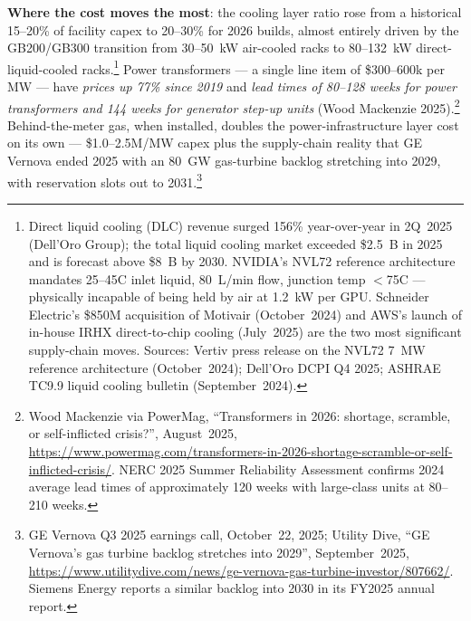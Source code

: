 \textbf{Where the cost moves the most}: the cooling layer ratio rose from a historical 15--20\% of facility capex to 20--30\% for 2026 builds, almost entirely driven by the GB200/GB300 transition from 30--50~kW air-cooled racks to 80--132~kW direct-liquid-cooled racks.\footnote{Direct liquid cooling (DLC) revenue surged 156\% year-over-year in 2Q~2025 (Dell'Oro Group); the total liquid cooling market exceeded \$2.5~B in 2025 and is forecast above \$8~B by 2030. NVIDIA's NVL72 reference architecture mandates 25--45\textdegree C inlet liquid, 80~L/min flow, junction temp $<$75\textdegree C --- physically incapable of being held by air at 1.2~kW per GPU. Schneider Electric's \$850M acquisition of Motivair (October~2024) and AWS's launch of in-house IRHX direct-to-chip cooling (July~2025) are the two most significant supply-chain moves. Sources: Vertiv press release on the NVL72 7~MW reference architecture (October~2024); Dell'Oro DCPI Q4 2025; ASHRAE TC9.9 liquid cooling bulletin (September~2024).} Power transformers --- a single line item of \$300--600k per MW --- have \emph{prices up 77\% since 2019} and \emph{lead times of 80--128 weeks for power transformers and 144 weeks for generator step-up units} (Wood Mackenzie 2025).\footnote{Wood Mackenzie via PowerMag, ``Transformers in 2026: shortage, scramble, or self-inflicted crisis?'', August~2025, \url{https://www.powermag.com/transformers-in-2026-shortage-scramble-or-self-inflicted-crisis/}. NERC 2025 Summer Reliability Assessment confirms 2024 average lead times of approximately 120 weeks with large-class units at 80--210 weeks.} Behind-the-meter gas, when installed, doubles the power-infrastructure layer cost on its own --- \$1.0--2.5M/MW capex plus the supply-chain reality that GE Vernova ended 2025 with an 80~GW gas-turbine backlog stretching into 2029, with reservation slots out to 2031.\footnote{GE Vernova Q3 2025 earnings call, October~22, 2025; Utility Dive, ``GE Vernova's gas turbine backlog stretches into 2029'', September~2025, \url{https://www.utilitydive.com/news/ge-vernova-gas-turbine-investor/807662/}. Siemens Energy reports a similar backlog into 2030 in its FY2025 annual report.}

